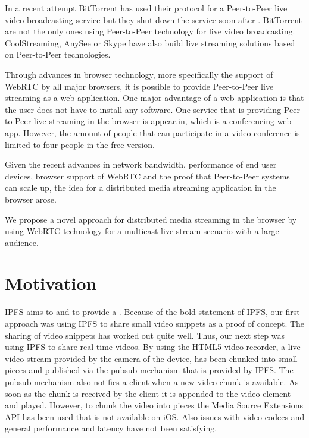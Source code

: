 In a recent attempt BitTorrent has used their protocol for a Peer-to-Peer live video broadcasting service \cite{bittorrent-live} but they shut down the service soon after \cite{bittorrent-live-shutdown}. BitTorrent are not the only ones using Peer-to-Peer technology for live video broadcasting. CoolStreaming, AnySee or Skype have also build live streaming solutions based on Peer-to-Peer technologies.

Through advances in browser technology, more specifically the support of WebRTC by all major browsers, it is possible to provide Peer-to-Peer live streaming as a web application. One major advantage of a web application is that the user does not have to install any software. 
One service that is providing Peer-to-Peer live streaming in the browser is appear.in, which is a conferencing web app. However, the amount of people that can participate in a video conference is limited to four people in the free version.

Given the recent advances in network bandwidth, performance of end user devices, browser support of WebRTC and the proof that Peer-to-Peer systems can scale up, the idea for a distributed media streaming application in the browser arose.

We propose a novel approach for distributed media streaming in the browser by using WebRTC technology for a multicast live stream scenario with a large audience.

\section{Motivation}
IPFS aims to  and to provide a  \cite{ipfs-website}.
Because of the bold statement of IPFS, our first approach was using IPFS to share small video snippets as a proof of concept. The sharing of video snippets has worked out quite well. Thus, our next step was using IPFS to share real-time videos. By using the HTML5 video recorder, a live video stream provided by the camera of the device, has been chunked into small pieces and published via the pubsub mechanism that is provided by IPFS. The pubsub mechanism also notifies a client when a new video chunk is available. As soon as the chunk is received by the client it is appended to the video element and played. However, to chunk the video into pieces the Media Source Extensions API has been used that is not available on iOS. Also issues with video codecs and general performance and latency have not been satisfying.

